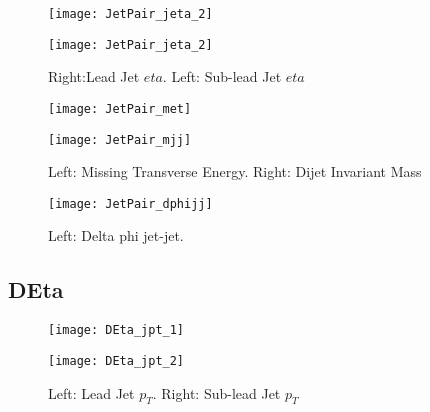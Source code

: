 \documentclass[a4paper,10pt]{article}
\begin{document}
\begin{figure}[!h]
\centering
\begin{minipage}[!h]{0.4\linewidth}
\centering
\texttt{[image: JetPair\_jeta\_2]}
\end{minipage}%
\begin{minipage}[!h]{0.4\linewidth}
\centering
\texttt{[image: JetPair\_jeta\_2]}
\end{minipage}
\caption{Right:Lead Jet $eta$. Left: Sub-lead Jet $eta$}
\end{figure}

\begin{figure}[!h]
\centering
\begin{minipage}[!h]{0.4\linewidth}
\centering
\texttt{[image: JetPair\_met]}
\end{minipage}%
\begin{minipage}[!h]{0.4\linewidth}
\centering
\texttt{[image: JetPair\_mjj]}
\end{minipage}
\caption{Left: Missing Transverse Energy. Right: Dijet Invariant Mass}
\end{figure}

\begin{figure}[!h]
\centering
\begin{minipage}[!h]{0.4\linewidth}
\centering
\texttt{[image: JetPair\_dphijj]}
\end{minipage}%
\begin{minipage}[!h]{0.4\linewidth}
\centering
\end{minipage}
\caption{Left: Delta phi jet-jet.}
\end{figure}

\clearpage
\subsection{DEta}

\begin{figure}[!h]
\centering
\begin{minipage}[!h]{0.4\linewidth}
\centering
\texttt{[image: DEta\_jpt\_1]}
\end{minipage}%
\begin{minipage}[!h]{0.4\linewidth}
  \texttt{[image: DEta\_jpt\_2]}
\end{minipage}
\caption{Left: Lead Jet $p_T$. Right: Sub-lead Jet $p_T$}
\end{figure}
\end{document}
